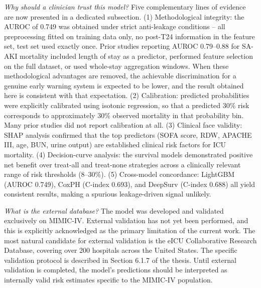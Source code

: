 \documentclass[12pt,a4paper]{article}
\begin{document}
\begin{flushleft}
\textit{Why should a clinician trust this model?} Five complementary lines of evidence are now presented in a dedicated subsection. (1) Methodological integrity: the AUROC of 0.749 was obtained under strict anti-leakage conditions -- all preprocessing fitted on training data only, no post-T24 information in the feature set, test set used exactly once. Prior studies reporting AUROC 0.79--0.88 for SA-AKI mortality included length of stay as a predictor, performed feature selection on the full dataset, or used whole-stay aggregation windows. When these methodological advantages are removed, the achievable discrimination for a genuine early warning system is expected to be lower, and the result obtained here is consistent with that expectation. (2) Calibration: predicted probabilities were explicitly calibrated using isotonic regression, so that a predicted 30\% risk corresponds to approximately 30\% observed mortality in that probability bin. Many prior studies did not report calibration at all. (3) Clinical face validity: SHAP analysis confirmed that the top predictors (SOFA score, RDW, APACHE III, age, BUN, urine output) are established clinical risk factors for ICU mortality. (4) Decision-curve analysis: the survival models demonstrated positive net benefit over treat-all and treat-none strategies across a clinically relevant range of risk thresholds (8--30\%). (5) Cross-model concordance: LightGBM (AUROC 0.749), CoxPH (C-index 0.693), and DeepSurv (C-index 0.688) all yield consistent results, making a spurious leakage-driven signal unlikely.

\textit{What is the external database?} The model was developed and validated exclusively on MIMIC-IV. External validation has not yet been performed, and this is explicitly acknowledged as the primary limitation of the current work. The most natural candidate for external validation is the eICU Collaborative Research Database, covering over 200 hospitals across the United States. The specific validation protocol is described in Section 6.1.7 of the thesis. Until external validation is completed, the model's predictions should be interpreted as internally valid risk estimates specific to the MIMIC-IV population.

\vspace{\baselineskip}


\end{flushleft}
\end{document}
